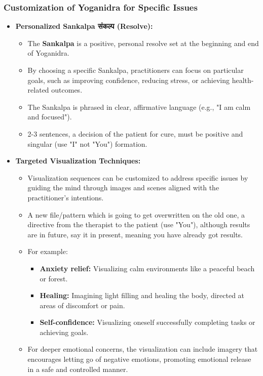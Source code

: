 \begin{frame}[fragile]\frametitle{Customization of Yoganidra for Specific Issues}
    \begin{itemize}
        \item \textbf{Personalized Sankalpa संकल्प  (Resolve):}
            \begin{itemize}
                \item The \textbf{Sankalpa} is a positive, personal resolve set at the beginning and end of Yoganidra.
                \item By choosing a specific Sankalpa, practitioners can focus on particular goals, such as improving confidence, reducing stress, or achieving health-related outcomes.
                \item The Sankalpa is phrased in clear, affirmative language (e.g., "I am calm and focused").
				\item 2-3 sentences, a decision of the patient for cure, must be positive and singular (use "I" not "You") formation.
            \end{itemize}
        
        \item \textbf{Targeted Visualization Techniques:}
            \begin{itemize}
                \item Visualization sequences can be customized to address specific issues by guiding the mind through images and scenes aligned with the practitioner’s intentions.
				\item A new file/pattern which is going to get overwritten on the old one, a directive from the therapist to the patient (use "You"), although results are in future, say it in present, meaning you have already got results.
                \item For example:
                    \begin{itemize}
                        \item \textbf{Anxiety relief:} Visualizing calm environments like a peaceful beach or forest.
                        \item \textbf{Healing:} Imagining light filling and healing the body, directed at areas of discomfort or pain.
                        \item \textbf{Self-confidence:} Visualizing oneself successfully completing tasks or achieving goals.
                    \end{itemize}
                \item For deeper emotional concerns, the visualization can include imagery that encourages letting go of negative emotions, promoting emotional release in a safe and controlled manner.					
            \end{itemize}
    \end{itemize}
\end{frame}

